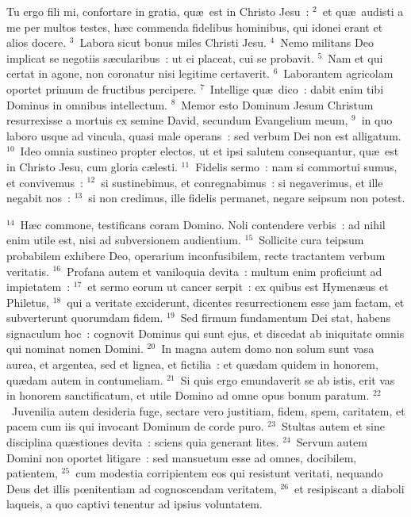 \bchapter
\lettrine[lines=3,image=true,loversize=0.05,lraise=-0.03]{T}{}u ergo fili mi, confortare in gratia, qu\ae\ est in Christo Jesu~:
${}^{2}$~et qu\ae\ audisti a me per multos testes, h\ae c commenda fidelibus hominibus, qui idonei erant et alios docere.
${}^{3}$~Labora sicut bonus miles Christi Jesu.
${}^{4}$~Nemo militans Deo implicat se negotiis s\ae cularibus~: ut ei placeat, cui se probavit.
${}^{5}$~Nam et qui certat in agone, non coronatur nisi legitime certaverit.
${}^{6}$~Laborantem agricolam oportet primum de fructibus percipere.
${}^{7}$~Intellige qu\ae\ dico~: dabit enim tibi Dominus in omnibus intellectum.
${}^{8}$~Memor esto Dominum Jesum Christum resurrexisse a mortuis ex semine David, secundum Evangelium meum,
${}^{9}$~in quo laboro usque ad vincula, quasi male operans~: sed verbum Dei non est alligatum.
${}^{10}$~Ideo omnia sustineo propter electos, ut et ipsi salutem consequantur, qu\ae\ est in Christo Jesu, cum gloria c\ae lesti.
${}^{11}$~Fidelis sermo~: nam si commortui sumus, et convivemus~:
${}^{12}$~si sustinebimus, et conregnabimus~: si negaverimus, et ille negabit nos~:
${}^{13}$~si non credimus, ille fidelis permanet, negare seipsum non potest.


${}^{14}$~H\ae c commone, testificans coram Domino. Noli contendere verbis~: ad nihil enim utile est, nisi ad subversionem audientium.
${}^{15}$~Sollicite cura teipsum probabilem exhibere Deo, operarium inconfusibilem, recte tractantem verbum veritatis.
${}^{16}$~Profana autem et vaniloquia devita~: multum enim proficiunt ad impietatem~:
${}^{17}$~et sermo eorum ut cancer serpit~: ex quibus est Hymen\ae us et Philetus,
${}^{18}$~qui a veritate exciderunt, dicentes resurrectionem esse jam factam, et subverterunt quorumdam fidem.
${}^{19}$~Sed firmum fundamentum Dei stat, habens signaculum hoc~: cognovit Dominus qui sunt ejus, et discedat ab iniquitate omnis qui nominat nomen Domini.
${}^{20}$~In magna autem domo non solum sunt vasa aurea, et argentea, sed et lignea, et fictilia~: et qu\ae dam quidem in honorem, qu\ae dam autem in contumeliam.
${}^{21}$~Si quis ergo emundaverit se ab istis, erit vas in honorem sanctificatum, et utile Domino ad omne opus bonum paratum.
${}^{22}$~Juvenilia autem desideria fuge, sectare vero justitiam, fidem, spem, caritatem, et pacem cum iis qui invocant Dominum de corde puro.
${}^{23}$~Stultas autem et sine disciplina qu\ae stiones devita~: sciens quia generant lites.
${}^{24}$~Servum autem Domini non oportet litigare~: sed mansuetum esse ad omnes, docibilem, patientem,
${}^{25}$~cum modestia corripientem eos qui resistunt veritati, nequando Deus det illis pœnitentiam ad cognoscendam veritatem,
${}^{26}$~et resipiscant a diaboli laqueis, a quo captivi tenentur ad ipsius voluntatem.

